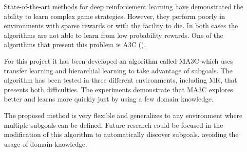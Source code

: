 
State-of-the-art methods for deep reinforcement learning have demonstrated the ability to learn complex game strategies.
However, they perform poorly in environments with sparse rewards or with the facility to die.
In both cases the algorithms are not able to learn from low probability rewards.
One of the algorithms that present this problem is \acf{A3C} (\cite{mnih2016A3C}).

For this project it has been developed an algorithm called \acf{MA3C} which uses transfer learning and hierarchial learning
to take advantage of subgoals.
The algorithm has been tested in three different environments, including \acl{MR}, that presents both difficulties.
The experiments demonstrate that \ac{MA3C} explores better and learns more quickly just by using a few domain knowledge.

The proposed method is very flexible and generalizes to any environment where multiple subgoals can be defined.
Future research could be focused in the modification of this algorithm to automatically discover subgoals,
avoiding the usage of domain knowledge.